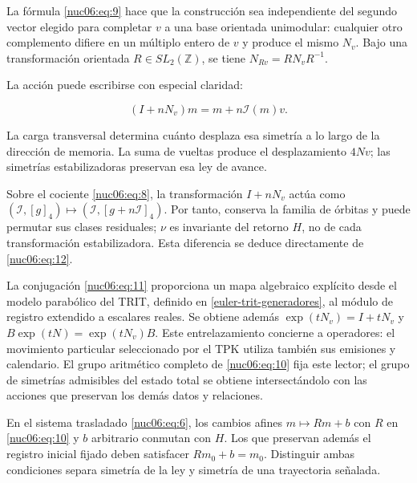 La fórmula \eqref{nuc06:eq:9} hace que la construcción sea independiente del segundo vector elegido para completar \(v\) a una base orientada unimodular: cualquier otro complemento difiere en un múltiplo entero de \(v\) y produce el mismo \(N_v\). Bajo una transformación orientada \(R\in SL_2(\mathbb Z)\), se tiene \(N_{Rv}=RN_vR^{-1}\).

La acción puede escribirse con especial claridad:

\begin{equation}
(I+nN_v)m=m+n\mathcal I(m)v.
\label{nuc06:eq:12}
\end{equation}

La carga transversal determina cuánto desplaza esa simetría a lo largo de la dirección de memoria. La suma de vueltas produce el desplazamiento \(4Nv\); las simetrías estabilizadoras preservan esa ley de avance.

Sobre el cociente \eqref{nuc06:eq:8}, la transformación \(I+nN_v\) actúa como \((\mathcal I,[g]_4)\mapsto(\mathcal I,[g+n\mathcal I]_4)\). Por tanto, conserva la familia de órbitas y puede permutar sus clases residuales; \(\nu\) es invariante del retorno \(H\), no de cada transformación estabilizadora. Esta diferencia se deduce directamente de \eqref{nuc06:eq:12}.

La conjugación \eqref{nuc06:eq:11} proporciona un mapa algebraico explícito desde el modelo parabólico del TRIT, definido en \cref{euler-trit-generadores}, al módulo de registro extendido a escalares reales. Se obtiene además \(\exp(tN_v)=I+tN_v\) y \(B\exp(tN)=\exp(tN_v)B\). Este entrelazamiento concierne a operadores: el movimiento particular seleccionado por el TPK utiliza también sus emisiones y calendario. El grupo aritmético completo de \eqref{nuc06:eq:10} fija este lector; el grupo de simetrías admisibles del estado total se obtiene intersectándolo con las acciones que preservan los demás datos y relaciones.

En el sistema trasladado \eqref{nuc06:eq:6}, los cambios afines \(m\mapsto Rm+b\) con \(R\) en \eqref{nuc06:eq:10} y \(b\) arbitrario conmutan con \(H\). Los que preservan además el registro inicial fijado deben satisfacer \(Rm_0+b=m_0\). Distinguir ambas condiciones separa simetría de la ley y simetría de una trayectoria señalada.

